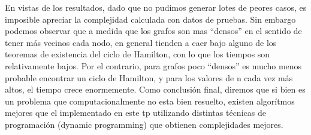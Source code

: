 En vistas de los resultados, dado que no pudimos generar lotes de peores casos, es imposible apreciar la complejidad calculada con datos de pruebas. Sin embargo podemos observar que a medida que los grafos son mas ``densos'' en el sentido de tener más vecinos cada nodo, en general tienden a caer bajo alguno de los teoremas de existencia del ciclo de Hamilton, con lo que los tiempos son relativamente bajos. Por el contrario, para grafos poco ``densos'' es mucho menos probable encontrar un ciclo de Hamilton, y para los valores de n cada vez más altos, el tiempo crece enormemente.
Como conclusión final, diremos que si bien es un problema que computacionalmente no esta bien resuelto, existen algorítmos mejores que el implementado en este tp utilizando distintas técnicas de programación (dynamic programming) que obtienen complejidades mejores.